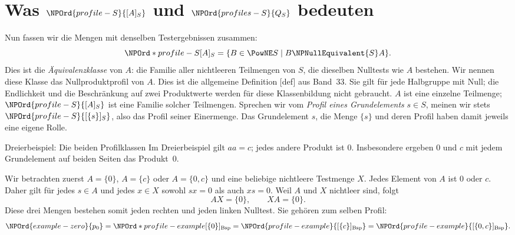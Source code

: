 \par{}
\section*{Was \(\NPOrd{profile-S}{[A]_S}\) und \(\NPOrd{profiles-S}{Q_S}\) bedeuten}

Nun fassen wir die Mengen mit denselben Testergebnissen zusammen:
\[
 \NPOrd*{profile-S}{[A]_S}=\{B\in\PowNE S\mid B\NPNullEquivalent{S} A\}.
\]
Dies ist die \emph{Äquivalenzklasse} von \(A\): die Familie aller
nichtleeren Teilmengen von \(S\), die dieselben Nulltests wie \(A\)
bestehen. Wir nennen diese Klasse das Nullproduktprofil von \(A\).
Dies ist die allgemeine Definition
[def] aus Band~33. Sie gilt für
jede Halbgruppe mit Null; die Endlichkeit und die Beschränkung auf
zwei Produktwerte werden für diese Klassenbildung nicht gebraucht.
\(A\) ist eine einzelne Teilmenge; \(\NPOrd{profile-S}{[A]_S}\) ist eine Familie solcher
Teilmengen. Sprechen wir vom \emph{Profil eines Grundelements}
\(s\in S\), meinen wir stets \(\NPOrd{profile-S}{[\{s\}]_S}\), also das Profil seiner
Einermenge. Das Grundelement \(s\), die Menge \(\{s\}\) und deren
Profil haben damit jeweils eine eigene Rolle.

\par{}
\begin{NPReadingExample}{Dreierbeispiel: Die beiden Profilklassen}
\hypertarget{nullproducts.reading.example-profiles}{}
Im Dreierbeispiel gilt \(aa=c\); jedes andere Produkt ist \(0\).
Insbesondere ergeben \(0\) und \(c\) mit jedem Grundelement auf
beiden Seiten das Produkt~\(0\).

Wir betrachten zuerst \(A=\{0\}\), \(A=\{c\}\) oder
\(A=\{0,c\}\) und eine beliebige nichtleere Testmenge \(X\).
Jedes Element von \(A\) ist \(0\) oder \(c\). Daher gilt für
jedes \(s\in A\) und jedes \(x\in X\) sowohl \(sx=0\) als auch
\(xs=0\). Weil \(A\) und \(X\) nichtleer sind, folgt
\[
 AX=\{0\},\qquad XA=\{0\}.
\]
Diese drei Mengen bestehen somit jeden rechten und jeden linken
Nulltest. Sie gehören zum selben Profil:
\[
 \NPOrd{example-zero}{p_0}=\NPOrd*{profile-example}{[\{0\}]_{\mathrm{Bsp}}}=\NPOrd{profile-example}{[\{c\}]_{\mathrm{Bsp}}}=\NPOrd{profile-example}{[\{0,c\}]_{\mathrm{Bsp}}}.
\]
\end{NPReadingExample}

